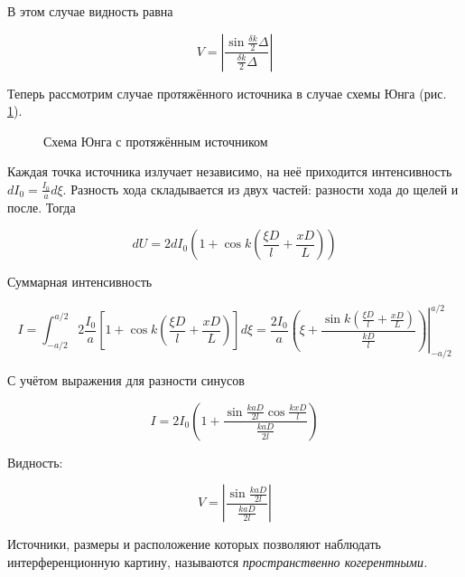 \noindent
В этом случае видность равна

\begin{equation}
    V = \left| \frac{\sin \frac{\delta k}{2} \Delta}{\frac{\delta k}{2} \Delta} \right|
\end{equation}

Теперь рассмотрим случае протяжённого источника в случае схемы Юнга (рис. \ref{fig:пространственная когерентность}).

\begin{figure}[htbp]
    \centering
    
    \caption{Схема Юнга с протяжённым источником}
    \label{fig:пространственная когерентность}
\end{figure}

Каждая точка источника излучает независимо, на неё приходится интенсивность $d I_0 = \frac{I_0}{a} d \xi$. Разность хода складывается из двух частей: разности хода до щелей и после. Тогда

\begin{equation*}
    d U = 2 d I_0 \left( 1 + \cos k \left( \frac{\xi D}{l} + \frac{x D}{L} \right) \right)
\end{equation*}

\noindent
Суммарная интенсивность

\begin{equation*}
    I = \int_{- a / 2}^{a / 2} 2 \frac{I_0}{a} \left[ 1 + \cos k \left( \frac{\xi D}{l} + \frac{x D}{L} \right) \right] d \xi = \left. \frac{2 I_0}{a} \left( \xi + \frac{\sin k \left( \frac{\xi D}{l} + \frac{x D}{L} \right) }{\frac{k D}{l}} \right) \right|_{- a / 2}^{a / 2}
\end{equation*}

\noindent
С учётом выражения для разности синусов

\begin{equation}
    I = 2 I_0 \left( 1 + \frac{\sin \frac{k a D}{2 l} \cos \frac{k x D}{l}}{\frac{k a D}{2 l}} \right)
\end{equation}

\noindent
Видность:

\begin{equation}
    V = \left| \frac{\sin \frac{k a D}{2 l}}{\frac{k a D}{2 l }} \right|
\end{equation}

\noindent
Источники, размеры и расположение которых позволяют наблюдать интерференционную картину, называются \textit{пространственно когерентными.}

